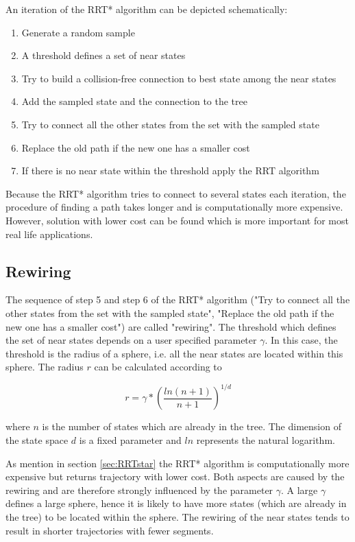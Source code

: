 An iteration of the RRT* algorithm can be depicted schematically:


\begin{enumerate}
  \item Generate a random sample
  \item A threshold defines a set of near states
  \item Try to build a collision-free connection to best state among the near states
  \item Add the sampled state and the connection to the tree 
  \item Try to connect all the other states from the set with the sampled state 
  \item Replace the old path if the new one has a smaller cost
  \item If there is no near state within the threshold apply the RRT algorithm
\end{enumerate}


Because the RRT* algorithm tries to connect to several states each iteration, the procedure of finding a path takes longer and is computationally more expensive. However, solution with lower cost can be found which is more important for most real life applications.

\subsection{Rewiring}

The sequence of step 5 and step 6 of the RRT* algorithm ("Try to connect all the other states from the set with the sampled state", "Replace the old path if the new one has a smaller cost") are called "rewiring". \newline 
The threshold which defines the set of near states depends on a user specified parameter $\gamma$. In this case, the threshold is the radius of a sphere, i.e. all the near states are located within this sphere. The radius $r$ can be calculated according to


\begin{equation}
r = \gamma * \left(\frac{ln(n+1)}{n+1}\right)^{1/d}
\label{equ:ballradius}
\end{equation}

where $n$ is the number of states which are already in the tree. The dimension of the state space $d$ is a fixed parameter and $ln$ represents the natural logarithm.\newline

As mention in section \ref{sec:RRTstar} the RRT* algorithm is computationally more expensive but returns trajectory with lower cost. Both aspects are caused by the rewiring and are therefore strongly influenced by the parameter $\gamma$. A large $\gamma$ defines a large sphere, hence it is likely to have more states (which are already in the tree) to be located within the sphere. The rewiring of the near states tends to result in shorter trajectories with fewer segments.

